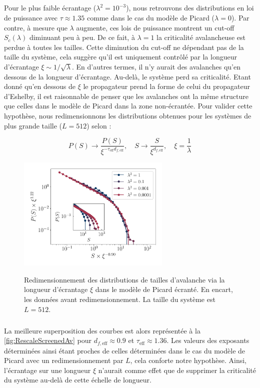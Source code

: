 \subparagraph{}Pour le plus faible écrantage ($\lambda^2 = 10^{-3}$), nous retrouvons des distributions en loi de puissance avec $\tau \approx 1.35$ comme dans le cas du modèle de Picard ($\lambda = 0$). Par contre, à mesure que $\lambda$ augmente, ces lois de puissance montrent un cut-off $S_c(\lambda)$ diminuant peu à peu. De ce fait, à $\lambda=1$ la criticalité avalancheuse est perdue à toutes les tailles. Cette diminution du cut-off ne dépendant pas de la taille du système, cela suggère qu'il est uniquement contrôlé par la longueur d'écrantage $\xi \sim 1/\sqrt{\lambda}$. En d'autres termes, il n'y aurait des avalanches qu'en dessous de la longueur d'écrantage. Au-delà, le système perd sa criticalité. Etant donné qu'en dessous de $\xi$ le propagateur prend la forme de celui du propagateur d'Eshelby, il est raisonnable de penser que les avalanches ont la même structure que celles dans le modèle de Picard dans la zone non-écrantée. Pour valider cette hypothèse, nous redimensionnons les distributions obtenues pour les systèmes de plus grande taille ($L=512$) selon :

\begin{equation}
	P(S) \rightarrow \frac{P(S)}{\xi^{-\tau_\text{eff}d_{f,\text{eff}}}},\quad S\rightarrow \frac{S}{\xi^{d_{f,\text{eff}}}}, \quad \xi = \frac{1}{\lambda}
\end{equation}

\begin{figure}[h]
	\centering
	\includegraphics[width=0.65\textwidth]{Chapitre6/Figures/RescaleScreenedAv.pdf}
	\label{fig:RescaleScreenedAv}
	\caption{Redimensionnement des distributions de tailles d'avalanche via la longueur d'écrantage $\xi$ dans le modèle de Picard écranté. En encart, les données avant redimensionnement. La taille du système est $L=512$.}
\end{figure}

\subparagraph{}La meilleure superposition des courbes est alors représentée à la \autoref{fig:RescaleScreenedAv} pour $d_{f,\text{eff}}\approx 0.9$ et $\tau_\text{eff} \approx 1.36$. Les valeurs des exposants déterminées ainsi étant proches de celles déterminées dans le cas du modèle de Picard avec un redimensionnement par $L$, cela conforte notre hypothèse. Ainsi, l'écrantage sur une longueur $\xi$ n'aurait comme effet que de supprimer la criticalité du système au-delà de cette échelle de longueur.

